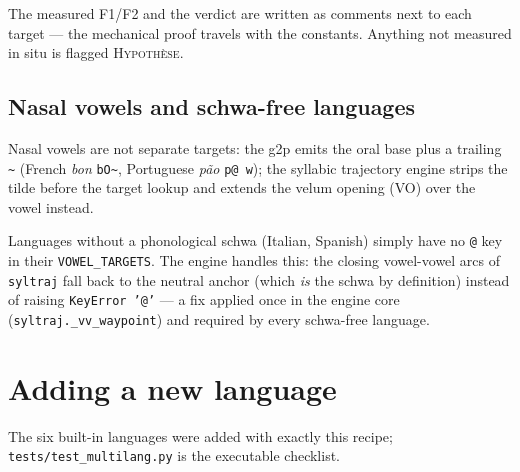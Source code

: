 \documentclass[11pt,a4paper]{article}
\newcommand{\code}[1]{\texttt{#1}}
\newcommand{\sampkey}[1]{\texttt{#1}}
\begin{document}
The measured F1/F2 and the verdict are written as comments next to
each target --- the mechanical proof travels with the constants.
Anything not measured in situ is flagged \textsc{Hypoth\`ese}.

\subsection{Nasal vowels and schwa-free languages}

Nasal vowels are not separate targets: the g2p emits the oral base
plus a trailing \sampkey{\textasciitilde} (French
\emph{bon} \sampkey{bO\textasciitilde}, Portuguese \emph{p\~ao}
\sampkey{p@~w}); the syllabic trajectory engine strips the tilde
before the target lookup and extends the velum opening (VO) over the
vowel instead.

Languages without a phonological schwa (Italian, Spanish) simply have
no \sampkey{@} key in their \code{VOWEL\_TARGETS}. The engine handles
this: the closing vowel-vowel arcs of \code{syltraj} fall back to the
neutral anchor (which \emph{is} the schwa by definition) instead of
raising \code{KeyError '@'} --- a fix applied once in the engine core
(\code{syltraj.\_vv\_waypoint}) and required by every schwa-free
language.

\section{Adding a new language}
\label{sec:newlang}

The six built-in languages were added with exactly this recipe;
\code{tests/test\_multilang.py} is the executable checklist.
\end{document}
